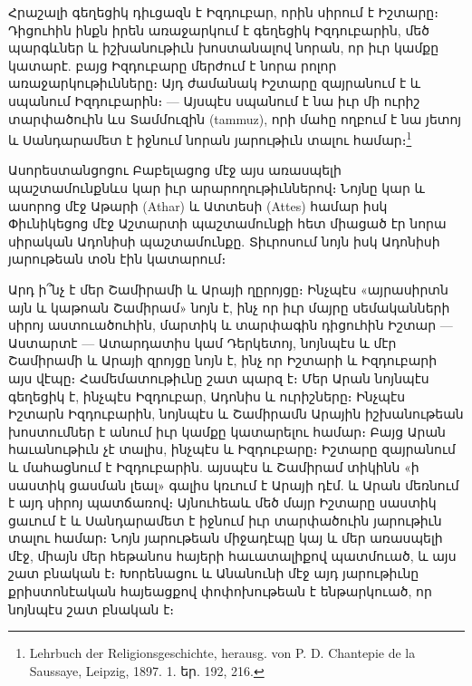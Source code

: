 \documentclass{article}
\begin{document}
{Հրաշալի գեղեցիկ դիւցազն է Իզդուբար, որին սիրում է Իշտարը։ Դիցուհին ինքն իրեն առաջարկում է գեղեցիկ Իզդուբարին, մեծ պարգևներ և իշխանութիւն խոստանալով նորան, որ իւր կամքը կատարէ. բայց Իզդուբարը մերժում է նորա րոլոր առաջարկութիւնները։ Այդ ժամանակ Իշտարը զայրանում է և սպանում Իզդուբարին։ — Այսպէս սպանում է նա իւր մի ուրիշ տարփածուին ևս Տամմուզին (tammuz), որի մահը ողբում է նա յետոյ և Սանդարամետ է իջնում նորան յարութիւն տալու համար։\footnote{Lehrbuch der Religionsgeschichte, herausg. von P. D. Chantepie de la Saussaye, Leipzig, 1897. 1. եր. 192, 216.}

Ասորեստանցոցու Բաբելացոց մէջ այս առասպելի պաշտամունքնևս կար իւր արարողութիւններով։ Նոյնը կար և ասորոց մէջ Աթարի (Athar) և Ատտեսի (Attes) համար իսկ Փիւնիկեցոց մէջ Աշտարտի պաշտամունքի հետ միացած էր նորա սիրական Ադոնիսի պաշտամունքը. Տիւրոսում նոյն իսկ Ադոնիսի յարութեան տօն էին կատարում։

Արդ ի՞նչ է մեր Շամիրամի և Արայի ղըրոյցը։ Ինչպէս «այրասիրտն այն և կաթոան Շամիրամ» նոյն է, ինչ որ իւր մայրը սեմականների սիրոյ աստուածուհին, մարտիկ և տարփագին դիցուհին Իշտար — Աստարտէ — Ատարդատիս կամ Դերկետոյ, նոյնպէս և մէր Շամիրամի և Արայի զրոյցը նոյն է, ինչ որ Իշտարի և Իզդուբարի այս վէպը։ Համեմատութիւնը շատ պարզ է։ Մեր Արան նոյնպէս գեղեցիկ է, ինչպէս Իզդուբար, Ադոնիս և ուրիշները։ Ինչպէս Իշտարն Իզդուբարին, նոյնպէս և Շամիրամն Արային իշխանութեան խոստումներ է անում իւր կամքը կատարելու համար։ Բայց Արան հաւանութիւն չէ տալիս, ինչպէս և Իզդուբարը։ Իշտարը զայրանում և մահացնում է Իզդուբարին. այսպէս և Շամիրամ տիկինն «ի սաստիկ ցասման լեալ» գալիս կռւում է Արայի դէմ. և Արան մեռնում է այդ սիրոյ պատճառով։ Այնուհեաև մեծ մայր Իշտարը սաստիկ ցաւում է և Սանդարամետ է իջնում իւր տարփածուին յարութիւն տալու համար։ Նոյն յարութեան միջադէպը կայ և մեր առասպելի մէջ, միայն մեր հեթանոս հայերի հաւատալիքով պատմուած, և այս շատ բնական է։ Խորենացու և Անանունի մէջ այդ յարութիւնը քրիստոնէական հայեացքով փոփոխութեան է ենթարկուած, որ նոյնպէս շատ բնական է։

}
\end{document}
